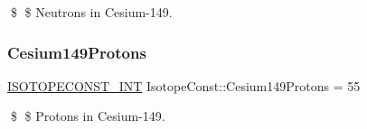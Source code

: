\$ \$ Neutrons in Cesium-\/149. \mbox{\label{group___isotope_const-_cesium-_cs149_ga32e1c7d023302a5a8426616a092d08da}} 
\subsubsection{\texorpdfstring{Cesium149\+Protons}{Cesium149Protons}}
{\footnotesize\ttfamily \mbox{\hyperlink{group___isotope_const-_macros_ga5f18360b3e99483a35c32d789e62621c}{I\+S\+O\+T\+O\+P\+E\+C\+O\+N\+S\+T\+\_\+\+I\+NT}} Isotope\+Const\+::\+Cesium149\+Protons = 55}

\$ \$ Protons in Cesium-\/149. 